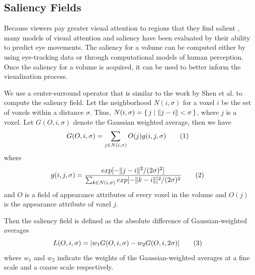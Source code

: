 \subsection{Saliency Fields \label{saliency_fields}}
Because viewers pay greater visual attention to regions that they find salient \cite{palmer_vision_1999}, many models of visual attention and saliency have been evaluated by their ability to predict eye movements. The saliency for a volume can be computed either by using eye-tracking data or through computational models of human perception. Once the saliency for a volume is acquired, it can be used to better inform the visualization process.

We use a center-surround operator that is similar to the work by Shen et al. \cite{shen_spatiotemporal_2015} to compute the saliency field.
Let the neighborhood $ N(i,\sigma) $ for a voxel $ i $ be the set of voxels within a distance $ \sigma $. Thus, $ N(i,\sigma)=\set{j|\|j-i\|<\sigma} $, where $ j $ is a voxel. Let $ G(O,i,\sigma) $ denote the Gaussian weighted average, then we have
\[ G(O,i,\sigma)=\sum_{j \in N(i,\sigma)} O(j) g(i,j,\sigma)
\addtag \]
where
\[ g(i,j,\sigma)=\frac{exp[-\|j-i\|^{2}/(2\sigma)^{2}]}{\sum_{k\in N(i,\sigma)} exp[-\|k-i\|]^{2}/(2\sigma)^{2}}
\addtag \]
and $ O $ is a field of appearance attributes of every voxel in the volume and $ O(j) $ is the appearance attribute of voxel $ j $.

Then the saliency field is defined as the absolute difference of Gaussian-weighted averages
\[ L(O,i,\sigma)=|w_{1}G(O,i,\sigma)-w_{2}G(O,i,2\sigma)|
\addtag \]
where $ w_{1} $ and $ w_{2} $ indicate the weights of the Gaussian-weighted averages at a fine scale and a coarse scale respectively.

